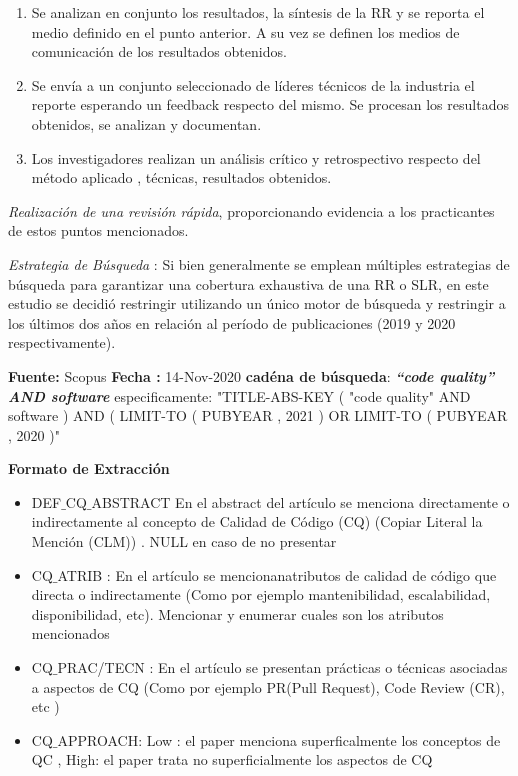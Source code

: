 \documentclass[conference]{IEEEtran}
\begin{document}
\begin{enumerate}
\item Se analizan en conjunto los resultados, la síntesis de la RR y se reporta el medio definido en el punto anterior. A su vez se definen los medios de comunicación de los resultados obtenidos. 
\item Se envía a un conjunto seleccionado de líderes técnicos de la industria el reporte esperando un feedback respecto del mismo. Se procesan los resultados obtenidos, se analizan y documentan.
\item Los investigadores realizan un análisis crítico y retrospectivo respecto del método aplicado , técnicas, resultados obtenidos. 
\end{enumerate}




\textit{Realización de una revisión rápida}, proporcionando evidencia a los practicantes de estos puntos mencionados.

\textit{Estrategia de Búsqueda} :  Si bien generalmente se emplean múltiples estrategias de búsqueda para garantizar una cobertura exhaustiva de una RR o SLR, en este estudio se decidió restringir utilizando  un único motor de búsqueda y restringir a los últimos dos años en relación al período de publicaciones (2019 y 2020 respectivamente).

\textbf{Fuente:} Scopus 
\textbf{Fecha : }14-Nov-2020 
\textbf{cadéna de búsqueda}: \textit{\textbf{“code quality” AND software}}
especificamente: "TITLE-ABS-KEY ( "code quality" AND software ) AND ( LIMIT-TO ( PUBYEAR , 2021 ) OR LIMIT-TO ( PUBYEAR , 2020 )" 

\textbf{Formato de Extracción}
\begin{itemize}
\item  DEF$\_$CQ$\_$ABSTRACT   En el abstract del artículo se menciona directamente o indirectamente al concepto de Calidad de Código (CQ) (Copiar Literal la Mención (CLM)) . NULL en caso de no presentar   
\item CQ$\_$ATRIB  :  En el artículo se mencionanatributos de calidad de código que directa o indirectamente  (Como por ejemplo  mantenibilidad, escalabilidad, disponibilidad, etc). Mencionar y enumerar cuales son los atributos mencionados
\item CQ$\_$PRAC/TECN : En el artículo se presentan prácticas o técnicas asociadas a aspectos de CQ (Como por ejemplo PR(Pull Request), Code Review (CR), etc )
\item CQ$\_$APPROACH: Low : el paper menciona superficalmente los conceptos de QC , High: el paper trata no superficialmente los aspectos de CQ
\end{itemize}
\end{document}
